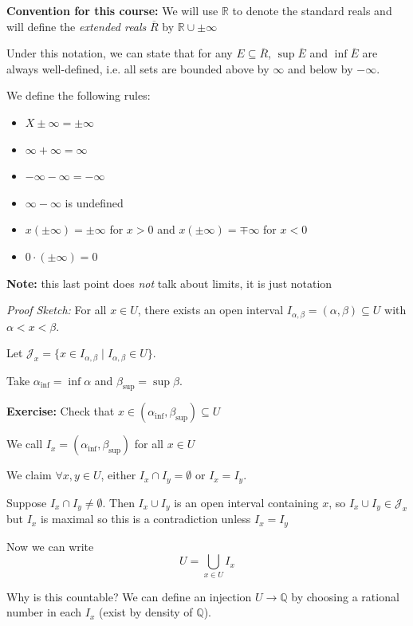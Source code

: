 \documentclass[12pt]{report}
\newcommand{\R}{\mathbb{R}}
\newcommand{\Q}{\mathbb{Q}}
\newcommand{\sub}{\subseteq}
\renewcommand{\bar}[1]{\overline{#1}}
\newenvironment*{tbox}[2][gray]{
    \begin{tcolorbox}[
        parbox=false,
        colback=#1!5!white,
        colframe=#1!75!black,
        breakable,
        title={#2}
    ]}
    {\end{tcolorbox}}
\newenvironment*{exercise}[1][red]{
    \begin{tcolorbox}[
        parbox=false,
        colback=#1!5!white,
        colframe=#1!75!black,
        breakable
    ]}
    {\end{tcolorbox}}
\begin{document}
    \textbf{Convention for this course:} We will use $\R$ to denote the standard reals and will define the \emph{extended reals} $\bar R$ by $\R \cup \pm \infty$ 

    Under this notation, we can state that for any $E \sub \bar R$, $\sup \bar E$ and $\inf \bar E$ are always well-defined, i.e. all sets are bounded above by $\infty$ and below by $-\infty$.

    We define the following rules: 
    \begin{itemize}
        \item $X \pm  \infty = \pm \infty$ 
        \item $\infty + \infty = \infty$
        \item $-\infty - \infty = -\infty$
        \item $\infty - \infty$ is undefined
        \item $x(\pm \infty) = \pm \infty$ for $x > 0$ and $x(\pm \infty) = \mp \infty$ for $x < 0$
        \item $0 \cdot (\pm\infty) = 0$
    \end{itemize}

    \textbf{Note:} this last point does \emph{not} talk about limits, it is just notation 

    \begin{tbox}{\textbf{Proposition:} Every open set in $\R$ is a countable disjoint union of open intervals}
        \emph{Proof Sketch:} For all $x \in U$, there exists an open interval $I_{\alpha, \beta} = (\alpha, \beta) \sub U$ with $\alpha < x < \beta$. 

        Let $\mathcal J_x = \{x \in I_{\alpha, \beta} \; | \; I_{\alpha, \beta} \in U\}$. 

        Take $\alpha_{\inf} = \inf \mathcal \alpha$ and $\beta_{\sup} = \sup \beta$. 

        \begin{exercise}
            \textbf{Exercise:} Check that $x \in (\alpha_{\inf}, \beta_{\sup}) \sub U$
        \end{exercise}

        We call $I_x = (\alpha_{\inf}, \beta_{\sup})$ for all $x \in U$ 

        We claim $\forall x, y \in U$, either $I_x \cap I_y = \emptyset$ or $I_x = I_y$.

        Suppose $I_x \cap I_y \neq \emptyset$. Then $I_x \cup I_y$ is an open interval containing $x$, so $I_x \cup I_y \in \mathcal J_x$ but $I_x$ is maximal so this is a contradiction unless $I_x = I_y$ 

        Now we can write 
        \[U = \bigcup_{x \in U} I_x\]

        Why is this countable? We can define an injection $U \to \Q$ by choosing a rational number in each $I_x$ (exist by density of $\Q$). 
    \end{tbox}
\end{document}
